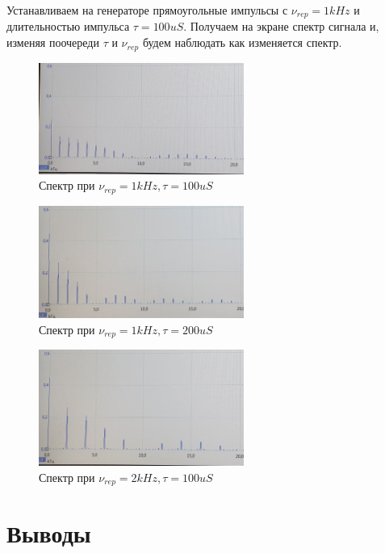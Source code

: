 \documentclass{article}
\begin{document}
Устанавливаем на генераторе прямоугольные импульсы с \( \nu_{rep} = 1kHz \) и длительностью импульса
\( \tau = 100uS \). Получаем на экране спектр сигнала и, изменяя поочереди $\tau$ и $\nu_{rep}$ будем
наблюдать как изменяется спектр.

\begin{figure}[H]
    \centering
    \includegraphics[width=0.6\textwidth]{1.jpg}
    \caption{Спектр при \( \nu_{rep} = 1 kHz, \tau = 100uS \)}
    \label{spec_1}
\end{figure}

\begin{figure}[H]
    \centering
    \includegraphics[width=0.6\textwidth]{2.jpg}
    \caption{Спектр при \( \nu_{rep} = 1 kHz, \tau = 200uS \)} 
    \label{spec_2}
\end{figure}

\begin{figure}[H]
    \centering
    \includegraphics[width=0.6\textwidth]{3.jpg}
    \caption{Спектр при \( \nu_{rep} = 2 kHz, \tau = 100uS \)} 
    \label{spec_3}
\end{figure}


\section{Выводы}
\end{document}
